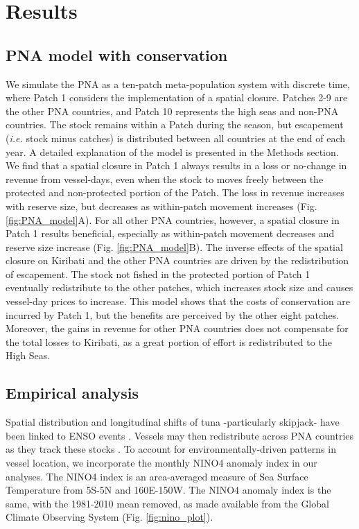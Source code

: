 \documentclass[9p,twocolumn,twoside,lineno]{pnas-new}
\begin{document}
\section{Results}\label{results}

\subsection{PNA model with conservation}

We simulate the PNA as a ten-patch meta-population system with discrete time, where Patch 1 considers the implementation of a spatial closure. Patches 2-9 are the other PNA countries, and Patch 10 represents the high seas and non-PNA countries. The stock remains within a Patch during the season, but escapement (\emph{i.e.} stock minus catches) is distributed between all countries at the end of each year. A detailed explanation of the model is presented in the Methods section. We find that a spatial closure in Patch 1 always results in a loss or no-change in revenue from vessel-days, even when the stock to moves freely between the protected and non-protected portion of the Patch. The loss in revenue increases with reserve size, but decreases as within-patch movement increases (Fig. \ref{fig:PNA_model}A). For all other PNA countries, however, a spatial closure in Patch 1 results beneficial, especially as within-patch movement decreases and reserve size increase (Fig. \ref{fig:PNA_model}B). The inverse effects of the spatial closure on Kiribati and the other PNA countries are driven by the redistribution of escapement. The stock not fished in the protected portion of Patch 1 eventually redistribute to the other patches, which increases stock size and causes vessel-day prices to increase. This model shows that the costs of conservation are incurred by Patch 1, but the benefits are perceived by the other eight patches. Moreover, the gains in revenue for other PNA countries does not compensate for the total losses to Kiribati, as a great portion of effort is redistributed to the High Seas.

\subsection{Empirical analysis}

Spatial distribution and longitudinal shifts of tuna -particularly skipjack- have been linked to ENSO events \cite{lehodey_1997}. Vessels may then redistribute across PNA countries as they track these stocks \cite{aqorau_2018}. To account for environmentally-driven patterns in vessel location, we incorporate the monthly NINO4 anomaly index in our analyses. The NINO4 index is an area-averaged measure of Sea Surface Temperature from 5S-5N and 160E-150W. The NINO4 anomaly index is the same, with the 1981-2010 mean removed, as made available from the Global Climate Observing System (Fig. \ref{fig:nino_plot}).
\end{document}
